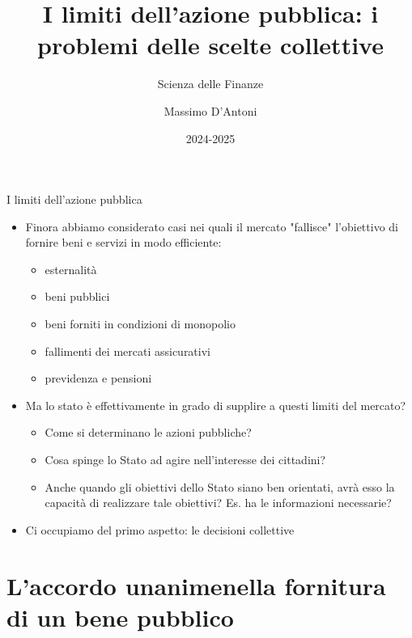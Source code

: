 \documentclass[aspectratio=64,12pt]{beamer}
\institute{Università di Siena}
\author{Massimo D'Antoni}
\date{2024-2025}
\title{I limiti dell'azione pubblica: \newline i problemi delle scelte collettive}
\subtitle{Scienza delle Finanze}
\begin{document}
\maketitle


\begin{frame}{I limiti dell'azione pubblica}
\begin{itemize}
\item Finora abbiamo considerato casi nei quali il mercato "fallisce" l'obiettivo
di fornire beni e servizi in modo efficiente:
\begin{itemize}
\item esternalità
\item beni pubblici
\item beni forniti in condizioni di monopolio
\item fallimenti dei mercati assicurativi
\item previdenza e pensioni
\end{itemize}
\item Ma lo stato è effettivamente in grado di supplire a questi limiti del mercato?
\begin{itemize}
\item Come si determinano le azioni pubbliche?
\item Cosa spinge lo Stato ad agire nell'interesse dei cittadini?
\item Anche quando gli obiettivi dello Stato siano ben orientati, avrà esso la
capacità di realizzare tale obiettivi? Es. ha le informazioni necessarie?
\end{itemize}
\item Ci occupiamo del primo aspetto: le decisioni collettive
\end{itemize}
\end{frame}

\section{L'accordo unanime\newline nella fornitura di un bene pubblico}
\end{document}
